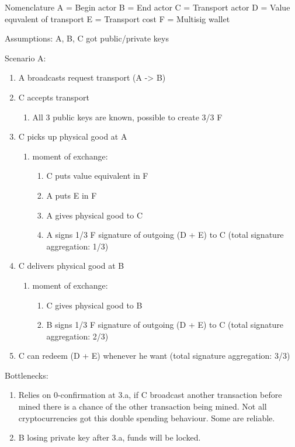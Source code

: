 \documentclass[Nomencl]{DylanMaster}
\begin{document}
Nomenclature
A = Begin actor
B = End actor
C = Transport actor
D = Value equvalent of transport
E = Transport cost
F = Multisig wallet

Assumptions:
A, B, C got public/private keys

Scenario A:
\begin{enumerate}
  \item A broadcasts request transport (A -> B)
  \item C accepts transport
  \begin{enumerate}
    \item All 3 public keys are known, possible to create 3/3 F
  \end{enumerate}
  \item C picks up physical good at A
  \begin{enumerate}
    \item moment of exchange:
    \begin{enumerate}
      \item C puts value equivalent in F
      \item A puts E in F
      \item A gives physical good to C
      \item A signs 1/3 F signature of outgoing (D + E) to C (total signature aggregation: 1/3)
    \end{enumerate}
  \end{enumerate}
  \item C delivers physical good at B
  \begin{enumerate}
    \item moment of exchange:
    \begin{enumerate}
      \item C gives physical good to B
      \item B signs 1/3 F signature of outgoing (D + E) to C (total signature aggregation: 2/3)
    \end{enumerate}
  \end{enumerate}
  \item C can redeem (D + E) whenever he want (total signature aggregation: 3/3)
\end{enumerate}

Bottlenecks:
\begin{enumerate}
  \item Relies on 0-confirmation at 3.a, if C broadcast another transaction before mined there is a chance of the other transaction being mined. Not all cryptocurrencies got this double spending behaviour. Some are reliable.
  \item B losing private key after 3.a, funds will be locked.
\end{enumerate}
\end{document}
